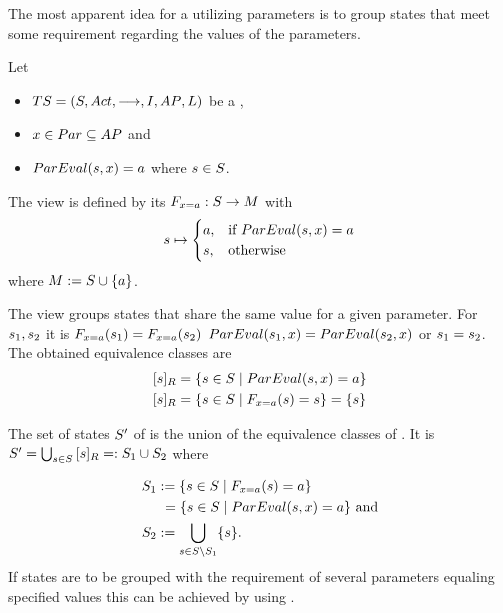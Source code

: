 \documentclass[preview]{standalone}
\begin{document}
The most apparent idea for a \viewN utilizing parameters is to group states that meet some requirement regarding the values of the parameters.


\begin{definition}
	Let
	\begin{itemize}
		\item ${TS} = {({S}, {Act}, {\longrightarrow}, {I}, {AP}, {L})}$ be a \chosengraphtypeN,
		\item ${x} \in {Par} \subseteq {AP}$ and 
		\item ${ParEval}({s}, {x}) = {a}$ where ${s} \in {S}$.		
	\end{itemize} 
	The view \viewparamvalues is defined by its \grpfctN ${{{F}}_{{x} = {a}}} : {S} \to {\ensuremath{{M}}}$ with
	\[
	{s} \mapsto
	\begin{cases}
		{a}, &\text{if } {ParEval}({s}, {x}) = {a}\\
		{s}, 	&\text{otherwise}
	\end{cases}
	\]
	where ${{M}} := {S} \cup \{a\}$.
\end{definition}

The view \viewparamvalues groups states that share the same value for a given parameter. For ${s}_1, {s}_2$ it is ${{{F}}_{{x} = {a}}}({s}_1) = {{{F}}_{{x} = {a}}}({s}_2)$ \iffN ${ParEval}({s}_1, {x}) = {ParEval}({s}_2, {x})$ or ${s}_1 = {s}_2$. The obtained equivalence classes are
\begin{align*}
	\eqclassv{\state} &= \{\state \in \states \mid \parameval(\state, \param) = \paramval\} \\
	\eqclassv{\state} &= \{\state \in \states \mid \gfctparamvalues(\state) = \state\} = \{\state\}
\end{align*}

The set of states ${S}'$ of \viewparamvalues is the union of the equivalence classes of \eqrelview. It is ${S}' = \bigcup_{{s} \in {S}} {{[{s}]_{{R}}}} =: {S}_1 \cup {S}_2$ where

\begin{align*}
	\states_1 &:= \{\state \in \states \mid \gfctparamvalues(\state) = \paramval\} \\
	&\hspace{1.15mm}= \{\state \in \states  \mid \parameval(\state, \param) = \paramval\} \text{ and} \\
	\states_2 &:= \remstates.
\end{align*}
If states are to be grouped with the requirement of several parameters equaling specified values this can be achieved by using \parllcompN. 
\end{document}
